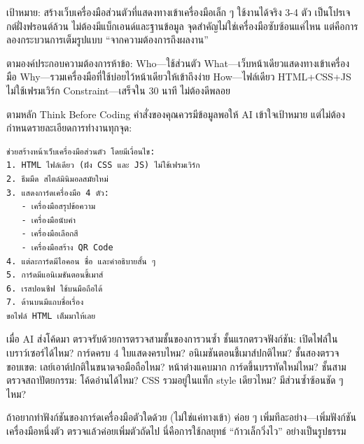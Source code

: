 



เป้าหมาย: สร้างเว็บเครื่องมือส่วนตัวที่แสดงทางเข้าเครื่องมือเล็ก ๆ ใช้งานได้จริง 3-4 ตัว เป็นโปรเจกต์ฝั่งฟรอนต์ล้วน ไม่ต้องมีแบ็กเอนด์และฐานข้อมูล จุดสำคัญไม่ใช่เครื่องมือซับซ้อนแค่ไหน แต่คือการลองกระบวนการเต็มรูปแบบ “จากความต้องการถึงผลงาน”

ตามองค์ประกอบความต้องการห้าข้อ: Who—ใช้ส่วนตัว What—เว็บหน้าเดียวแสดงทางเข้าเครื่องมือ Why—รวมเครื่องมือที่ใช้บ่อยไว้หน้าเดียวให้เข้าถึงง่าย How—ไฟล์เดียว HTML+CSS+JS ไม่ใช้เฟรมเวิร์ก Constraint—เสร็จใน 30 นาที ไม่ต้องดีพลอย


ตามหลัก Think Before Coding คำสั่งของคุณควรมีข้อมูลพอให้ AI เข้าใจเป้าหมาย แต่ไม่ต้องกำหนดรายละเอียดการทำงานทุกจุด:

\begin{lstlisting}
ช่วยสร้างหน้าเว็บเครื่องมือส่วนตัว โดยมีเงื่อนไข:
1. HTML ไฟล์เดียว (ฝัง CSS และ JS) ไม่ใช้เฟรมเวิร์ก
2. ธีมมืด สไตล์มินิมอลสมัยใหม่
3. แสดงการ์ดเครื่องมือ 4 ตัว:
   - เครื่องมือสรุปข้อความ
   - เครื่องมือนับคำ
   - เครื่องมือเลือกสี
   - เครื่องมือสร้าง QR Code
4. แต่ละการ์ดมีไอคอน ชื่อ และคำอธิบายสั้น ๆ
5. การ์ดมีแอนิเมชันตอนชี้เมาส์
6. เรสปอนซีฟ ใช้บนมือถือได้
7. ด้านบนมีแถบชื่อเรื่อง
ขอไฟล์ HTML เต็มมาให้เลย
\end{lstlisting}


เมื่อ AI ส่งโค้ดมา ตรวจรับด้วยการตรวจสามชั้นของการวนซ้ำ ชั้นแรกตรวจฟังก์ชัน: เปิดไฟล์ในเบราว์เซอร์ได้ไหม? การ์ดครบ 4 ใบแสดงครบไหม? อนิเมชันตอนชี้เมาส์ปกติไหม? ชั้นสองตรวจขอบเขต: เลย์เอาต์ปกติในขนาดจอมือถือไหม? หน้าต่างแคบมาก การ์ดขึ้นบรรทัดใหม่ไหม? ชั้นสามตรวจสถาปัตยกรรม: โค้ดอ่านได้ไหม? CSS รวมอยู่ในแท็ก style เดียวไหม? มีส่วนซ้ำซ้อนชัด ๆ ไหม?

ถ้าอยากทำฟังก์ชันของการ์ดเครื่องมือตัวใดด้วย (ไม่ใช่แค่ทางเข้า) ค่อย ๆ เพิ่มทีละอย่าง—เพิ่มฟังก์ชันเครื่องมือหนึ่งตัว ตรวจแล้วค่อยเพิ่มตัวถัดไป นี่คือการใช้กลยุทธ์ “ก้าวเล็กวิ่งไว” อย่างเป็นรูปธรรม

